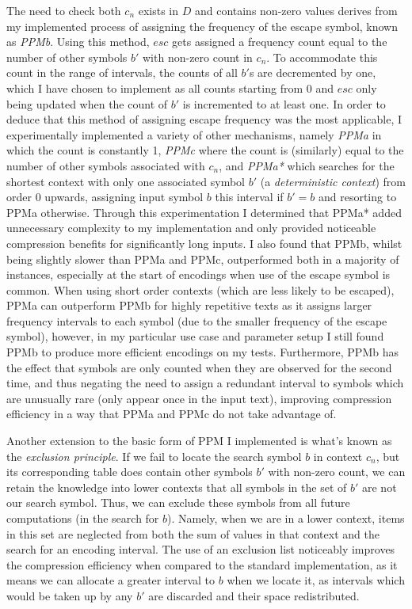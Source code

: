 \documentclass[a4paper, 11pt]{article}
\begin{document}
The need to check both $c_{n}$ exists in $D$ and contains non-zero values derives from my implemented process of assigning the frequency of the escape symbol, known as \emph{PPMb}. Using this method, $esc$ gets assigned a frequency count equal to the number of other symbols $b'$ with non-zero count in $c_{n}$. To accommodate this count in the range of intervals, the counts of all $b'$s are decremented by one, which I have chosen to implement as all counts starting from 0 and $esc$ only being updated when the count of $b'$ is incremented to at least one. In order to deduce that this method of assigning escape frequency was the most applicable, I experimentally implemented a variety of other mechanisms, namely \emph{PPMa} in which the count is constantly 1, \emph{PPMc} where the count is (similarly) equal to the number of other symbols associated with $c_{n}$, and \emph{PPMa*} which searches for the shortest context with only one associated symbol $b'$ (a \emph{deterministic context}) from order 0 upwards, assigning input symbol $b$ this interval if $b' = b$ and resorting to PPMa otherwise. Through this experimentation I determined that PPMa* added unnecessary complexity to my implementation and only provided noticeable compression benefits for significantly long inputs. I also found that PPMb, whilst being slightly slower than PPMa and PPMc, outperformed both in a majority of instances, especially at the start of encodings when use of the escape symbol is common. When using short order contexts (which are less likely to be escaped), PPMa can outperform PPMb for highly repetitive texts as it assigns larger frequency intervals to each symbol (due to the smaller frequency of the escape symbol), however, in my particular use case and parameter setup I still found PPMb to produce more efficient encodings on my tests. Furthermore, PPMb has the effect that symbols are only counted when they are observed for the second time, and thus negating the need to assign a redundant interval to symbols which are unusually rare (only appear once in the input text), improving compression efficiency in a way that PPMa and PPMc do not take advantage of. 

Another extension to the basic form of PPM I implemented is what's known as the \emph{exclusion principle}. If we fail to locate the search symbol $b$ in context $c_{n}$, but its corresponding table does contain other symbols $b'$ with non-zero count, we can retain the knowledge into lower contexts that all symbols in the set of $b'$ are not our search symbol. Thus, we can exclude these symbols from all future computations (in the search for $b$). Namely, when we are in a lower context, items in this set are neglected from both the sum of values in that context and the search for an encoding interval. The use of an exclusion list noticeably improves the compression efficiency when compared to the standard implementation, as it means we can allocate a greater interval to $b$ when we locate it, as intervals which would be taken up by any $b'$ are discarded and their space redistributed.
\end{document}
